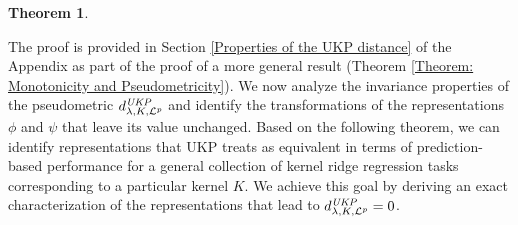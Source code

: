 \documentclass{article} %
\newcommand{\N}{\mathbb{N}}
\newcommand{\repone}{\phi}
\newcommand{\reptwo}{\psi}
\newcommand{\repthree}{\varphi}
\newcommand{\metricstname}{UKP }
\newcommand{\dLp}{d_{\lambda,K,\mathcal{L}^{p}}^{\emph{\metricstname}}}
\theoremstyle{plain}
\newcounter{theoremno}
\newtheorem{theorem}[theoremno]{Theorem}
\begin{document}
\begin{theorem}
\end{theorem}

The proof is provided in Section \ref{Properties of the UKP distance} of the Appendix as part of the proof of a more general result (Theorem \ref{Theorem: Monotonicity and Pseudometricity}). We now analyze the invariance properties of the pseudometric $\dLp$ and identify the transformations of the representations $\repone$ and $\reptwo$ that leave its value unchanged. Based on the following theorem, we can identify representations that \metricstname treats as equivalent in terms of prediction-based performance for a general collection of kernel ridge regression tasks corresponding to a particular kernel $K$. We achieve this goal by deriving an exact characterization of the representations that lead to $\dLp=0$.
\end{document}

